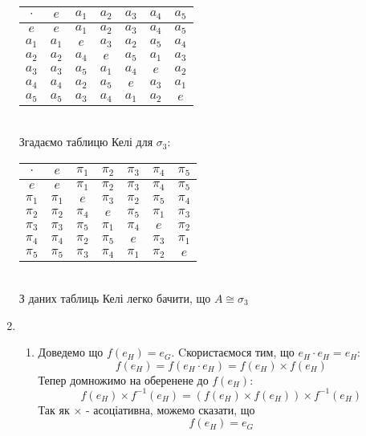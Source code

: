\documentclass[a4paper,12pt]{article}
\begin{document}
\begin{justify}
\begin{enumerate}
 			\begin{table}[htp]\centering
\begin{tabular}{|c|c|c|c|c|c|c|}
\hline
$\cdot$ & $e$   & $a_1$ & $a_2$ & $a_3$ & $a_4$ & $a_5$ \\ \hline
$e$     & $e$   & $a_1$ & $a_2$ & $a_3$ & $a_4$ & $a_5$ \\ \hline
$a_1$   & $a_1$ & $e$   & $a_3$ & $a_2$ & $a_5$ & $a_4$ \\ \hline
$a_2$   & $a_2$ & $a_4$ & $e$   & $a_5$ & $a_1$ & $a_3$ \\ \hline
$a_3$   & $a_3$ & $a_5$ & $a_1$ & $a_4$ & $e$   & $a_2$ \\ \hline
$a_4$   & $a_4$ & $a_2$ & $a_5$ & $e$   & $a_3$ & $a_1$ \\ \hline
$a_5$   & $a_5$ & $a_3$ & $a_4$ & $a_1$ & $a_2$ & $e$   \\ \hline
\end{tabular}
\end{table}
				\\Згадаємо таблицю Келі для $\sigma_3:$
				\begin{table}[htp]\centering
\begin{tabular}{|c|c|c|c|c|c|c|}
\hline
$\cdot$ & $e$     & $\pi_1$ & $\pi_2$ & $\pi_3$ & $\pi_4$ & $\pi_5$ \\ \hline
$e$     & $e$     & $\pi_1$ & $\pi_2$ & $\pi_3$ & $\pi_4$ & $\pi_5$ \\ \hline
$\pi_1$ & $\pi_1$ & $e$     & $\pi_3$ & $\pi_2$ & $\pi_5$ & $\pi_4$ \\ \hline
$\pi_2$ & $\pi_2$ & $\pi_4$ & $e$     & $\pi_5$ & $\pi_1$ & $\pi_3$ \\ \hline
$\pi_3$ & $\pi_3$ & $\pi_5$ & $\pi_1$ & $\pi_4$ & $e$     & $\pi_2$ \\ \hline
$\pi_4$ & $\pi_4$ & $\pi_2$ & $\pi_5$ & $e$     & $\pi_3$ & $\pi_1$ \\ \hline
$\pi_5$ & $\pi_5$ & $\pi_3$ & $\pi_4$ & $\pi_1$ & $\pi_2$ & $e$     \\ \hline
\end{tabular}
\end{table}	
				\\З даних таблиць Келі легко бачити, що $A\cong\sigma_3$
			\item \begin{enumerate}
				\item Доведемо що $f(e_H)=e_G$. Cкористаємося тим, що $e_H\cdot e_H=e_H:$ $$f(e_H)=f(e_H\cdot e_H)=f(e_H)\times f(e_H)$$ Тепер домножимо на оберенене до $f(e_H):$ $$f(e_H)\times f^{-1}(e_H)=(f(e_H)\times f(e_H))\times f^{-1}(e_H)$$ Так як $\times$ - асоціативна, можемо сказати, що $$f(e_H)=e_G$$

\end{enumerate}
\end{enumerate}
\end{justify}
\end{document}
